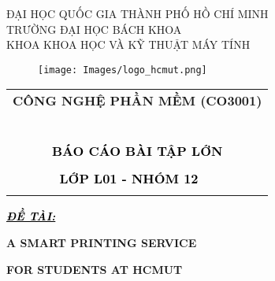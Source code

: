 \documentclass[a4paper]{article}
\theoremstyle{definition}
\begin{document}
\begin{titlepage}
\begin{center}
ĐẠI HỌC QUỐC GIA THÀNH PHỐ HỒ CHÍ MINH \\
TRƯỜNG ĐẠI HỌC BÁCH KHOA \\
KHOA KHOA HỌC VÀ KỸ THUẬT MÁY TÍNH \\
\end{center}

\vspace{1cm}

\begin{figure}[h!]
\begin{center}
\texttt{[image: Images/logo\_hcmut.png]}
\end{center}
\end{figure}

\begin{center}
    \begin{tabular}{c}
        \multicolumn{1}{c}{\textbf{{\huge \color{black} CÔNG NGHỆ PHẦN MỀM (CO3001)}}}\\
        ~~ \\
        \textcolor{black}{\textbf{\hrulefill\hrulefill\hrulefill\hrulefill\hrulefill\hrulefill\hrulefill\hrulefill\hrulefill\hrulefill\hrulefill}}
        \\
                   
                    \textcolor{black}{\textbf{{\huge BÁO CÁO BÀI TẬP LỚN}}}\\\\
                    \textcolor{black}{\textbf{{\large LỚP L01 - NHÓM 12}}}
        ~~\\
        \textcolor{black}{\textbf{\hrulefill\hrulefill\hrulefill\hrulefill\hrulefill\hrulefill\hrulefill\hrulefill\hrulefill\hrulefill\hrulefill}}
        \\
    \end{tabular}
\end{center}

\begin{flushleft}
    \fontsize{14pt}{17pt}\selectfont  
    \textbf{\textsl{\textcolor{black}{\uline{ĐỀ TÀI:}}}}
\end{flushleft}
\begin{center}
    \fontsize{18pt}{17pt}\selectfont 
    \textbf{\textrm{A SMART PRINTING SERVICE}} 
    
    \vspace{12pt}
    
    \textbf{\textrm{FOR STUDENTS AT HCMUT}}


\end{center}
\end{titlepage}
\end{document}
